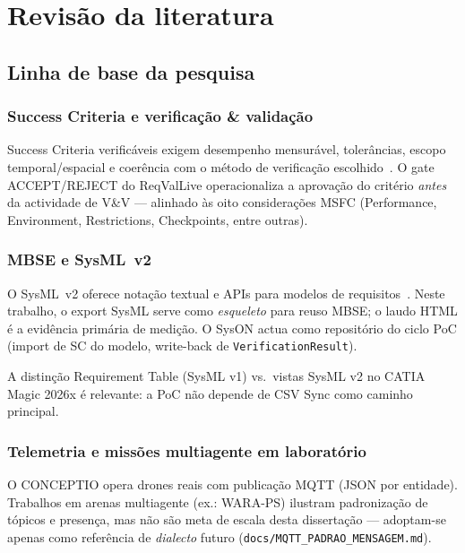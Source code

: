 \chapter{Revisão da literatura}
\label{cap:literatura}

\section{Linha de base da pesquisa}
\label{sec:baseline}

\subsection{Success Criteria e verificação \& validação}

Success Criteria verificáveis exigem desempenho mensurável, tolerâncias, escopo
temporal/espacial e coerência com o método de verificação escolhido~\cite{msfc3173,sis08methods}.
O gate ACCEPT/REJECT do ReqValLive operacionaliza a aprovação do critério
\emph{antes} da actividade de V\&V --- alinhado às oito considerações MSFC
(Performance, Environment, Restrictions, Checkpoints, entre outras).

\subsection{MBSE e SysML~v2}

O SysML~v2 oferece notação textual e APIs para modelos de requisitos~\cite{sysmlv2}.
Neste trabalho, o export SysML serve como \emph{esqueleto} para reuso MBSE; o laudo
HTML é a evidência primária de medição. O SysON actua como repositório do ciclo
PoC (import de SC do modelo, write-back de \texttt{VerificationResult}).

A distinção Requirement Table (SysML v1) vs.\ vistas SysML v2 no CATIA Magic 2026x
é relevante: a PoC não depende de CSV Sync como caminho principal.

\subsection{Telemetria e missões multiagente em laboratório}

O CONCEPTIO opera drones reais com publicação MQTT (JSON por entidade).
Trabalhos em arenas multiagente (ex.: WARA-PS) ilustram padronização de tópicos
e presença, mas não são meta de escala desta dissertação --- adoptam-se apenas
como referência de \emph{dialecto} futuro (\texttt{docs/MQTT\_PADRAO\_MENSAGEM.md}).

